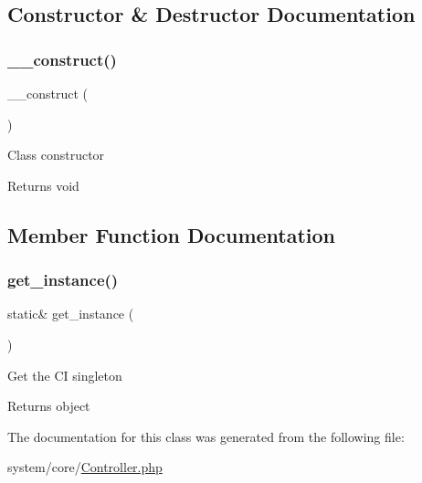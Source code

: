\subsection{Constructor \& Destructor Documentation}
\mbox{\label{class_c_i___controller_a095c5d389db211932136b53f25f39685}} 
\subsubsection{\texorpdfstring{\+\_\+\+\_\+construct()}{\_\_construct()}}
{\footnotesize\ttfamily \+\_\+\+\_\+construct (\begin{DoxyParamCaption}{ }\end{DoxyParamCaption})}

Class constructor

\begin{DoxyReturn}{Returns}
void 
\end{DoxyReturn}


\subsection{Member Function Documentation}
\mbox{\label{class_c_i___controller_a8d3cc57e7b6ec94e704712b0f277f5bb}} 
\subsubsection{\texorpdfstring{get\+\_\+instance()}{get\_instance()}}
{\footnotesize\ttfamily static\& get\+\_\+instance (\begin{DoxyParamCaption}{ }\end{DoxyParamCaption})\hspace{0.3cm}{\ttfamily [static]}}

Get the CI singleton

\begin{DoxyReturn}{Returns}
object 
\end{DoxyReturn}


The documentation for this class was generated from the following file\+:\begin{DoxyCompactItemize}
\item 
system/core/\mbox{\hyperlink{_controller_8php}{Controller.\+php}}\end{DoxyCompactItemize}
